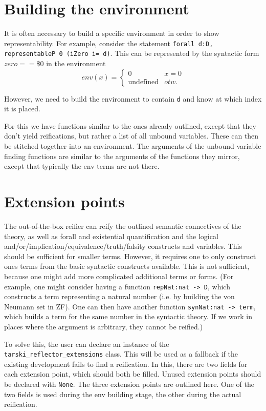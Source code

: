 \documentclass[11pt,a4paper]{article}
\begin{document}
\section{Building the environment}
It is often necessary to build a specific environment in order to show representability. For example, consider the statement \lstinline|forall d:D, representableP 0 (iZero i= d)|. This can be represented by the syntactic form $zero == \$0$ in the environment $$env(x) = \begin{cases}
0&x=0\\
\text{undefined}&otw.
\end{cases}$$

However, we need to build the environment to contain \lstinline|d| and know at which index it is placed.

For this we have functions similar to the ones already outlined, except that they don't yield reifications, but rather a list of all unbound variables. These can then be stitched together into an environment. The arguments of the unbound variable finding functions are similar to the arguments of the functions they mirror, except that typically the env terms are not there.
\newpage
\section{Extension points}
The out-of-the-box reifier can reify the outlined semantic connectives of the theory, as well as forall and existential quantification and the logical and/or/implication/equivalence/truth/falsity constructs and variables. This should be sufficient for smaller terms. However, it requires one to only construct ones terms from the basic syntactic constructs available. This is not sufficient, because one might add more complicated additional terms or forms. (For example, one might consider having a function \lstinline|repNat:nat -> D|, which constructs a term representing a natural number (i.e. by building the von Neumann set in ZF). One can then have another function \lstinline|synNat:nat -> term|, which builds a term for the same number in the syntactic theory. If we work in places where the argument is arbitrary, they cannot be reified.)

To solve this, the user can declare an instance of the \lstinline|tarski_reflector_extensions| class. This will be used as a fallback if the existing development fails to find a reification. In this, there are two fields for each extension point, which should both be filled. Unused extension points should be declared with \lstinline|None|. The three extension points are outlined here. One of the two fields is used during the env building stage, the other during the actual reification.
\end{document}
